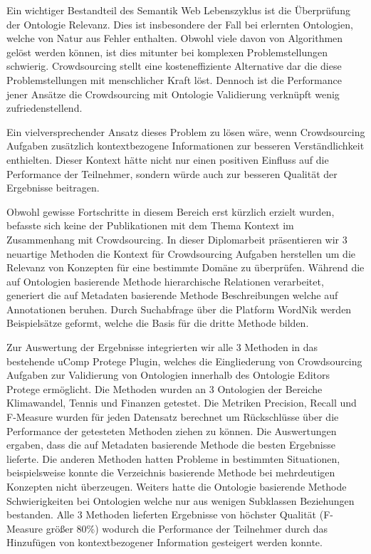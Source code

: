 \begin{kurzfassung}
	Ein wichtiger Bestandteil des Semantik Web Lebenszyklus ist die Überprüfung der Ontologie Relevanz. Dies ist insbesondere der Fall bei erlernten 
	Ontologien, welche von Natur aus Fehler enthalten. Obwohl viele davon von Algorithmen gelöst werden können, ist dies mitunter bei
	komplexen Problemstellungen schwierig. Crowdsourcing stellt eine kosteneffiziente Alternative dar die diese Problemstellungen mit menschlicher
	Kraft löst. Dennoch ist die Performance jener Ansätze die Crowdsourcing mit Ontologie Validierung verknüpft wenig zufriedenstellend. 
	
	Ein vielversprechender Ansatz dieses Problem zu lösen wäre, wenn Crowdsourcing Aufgaben zusätzlich kontextbezogene Informationen zur besseren
	Verständlichkeit enthielten. Dieser Kontext hätte nicht nur einen positiven Einfluss auf die Performance der Teilnehmer, sondern würde auch 
	zur besseren Qualität der Ergebnisse beitragen.
	
	Obwohl gewisse Fortschritte in diesem Bereich erst kürzlich erzielt wurden, befasste sich keine der Publikationen mit dem Thema Kontext
	im Zusammenhang mit Crowdsourcing. In dieser Diplomarbeit präsentieren wir 3 neuartige Methoden die Kontext für Crowdsourcing Aufgaben herstellen 
	um die Relevanz von Konzepten für eine bestimmte Domäne zu überprüfen. Während die auf Ontologien basierende Methode hierarchische Relationen
	verarbeitet, generiert die auf Metadaten basierende Methode Beschreibungen welche auf Annotationen beruhen. Durch Suchabfrage über die Platform
	WordNik	werden Beispielsätze geformt, welche die Basis für die dritte Methode bilden. 
	
	Zur Auswertung der Ergebnisse integrierten wir alle 3 Methoden in das bestehende uComp Protege Plugin, welches die Eingliederung von Crowdsourcing 
	Aufgaben zur Validierung von Ontologien innerhalb des Ontologie Editors Protege ermöglicht. Die Methoden wurden an 3 Ontologien der Bereiche
	Klimawandel, Tennis und Finanzen getestet. Die Metriken Precision, Recall und F-Measure wurden für jeden Datensatz berechnet um Rückschlüsse über 
	die Performance der getesteten Methoden ziehen zu können. Die Auswertungen ergaben, dass die auf Metadaten basierende Methode die besten
	Ergebnisse lieferte. Die anderen Methoden hatten Probleme in bestimmten Situationen, beispielsweise konnte die Verzeichnis basierende Methode 
	bei mehrdeutigen Konzepten nicht überzeugen. Weiters hatte die Ontologie basierende Methode Schwierigkeiten bei Ontologien welche nur aus wenigen
	Subklassen Beziehungen bestanden. Alle 3 Methoden lieferten Ergebnisse von höchster Qualität (F-Measure größer 80\%) wodurch die
	Performance der Teilnehmer durch das Hinzufügen von kontextbezogener Information gesteigert werden konnte. 
	
\end{kurzfassung}